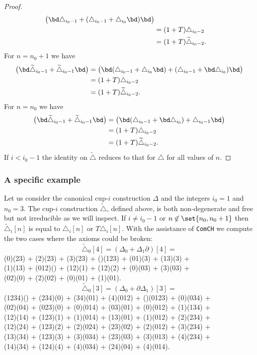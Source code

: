 \begin{proof}
\begin{align*}
		\big(\bd\triangle_{i_0-1} + (\triangle_{i_0-1} + \triangle_{i_0} \bd)\bd\big) \\ &=
		(1+T)\triangle_{i_0-2} \\ &=
		(1+T)\widetilde\triangle_{i_0-2}.
	\end{align*}
	For $n = n_0+1$ we have
	\begin{align*}
		\big(\bd\widetilde\triangle_{i_0-1} + \widetilde\triangle_{i_0-1} \bd\big) &=
		\big(\bd(\triangle_{i_0-1} + \triangle_{i_0} \bd) + (\triangle_{i_0-1} + \bd\triangle_{i_0})\bd \big) \\ &=
		(1+T)\triangle_{i_0-2} \\ &=
		(1+T)\widetilde\triangle_{i_0-2}.
	\end{align*}
	For $n = n_0$ we have
	\begin{align*}
		\big(\bd\widetilde\triangle_{i_0-1} + \widetilde\triangle_{i_0-1} \bd\big) &=
		\big(\bd(\triangle_{i_0-1} + \bd\triangle_{i_0}) + \triangle_{i_0-1}\bd \big) \\ &=
		(1+T)\triangle_{i_0-2} \\ &=
		(1+T)\widetilde\triangle_{i_0-2}.
	\end{align*}
	If $i<i_0-1$ the identity on $\widetilde\triangle$ reduces to that for $\triangle$ for all values of $n$.
\end{proof}

\subsubsection{A specific example}

Let us consider the canonical cup-$i$ construction $\Delta$ and the integers $i_0=1$ and $n_0=3$.
The cup-$i$ construction $\widetilde\triangle$, defined above, is both non-degenerate and free but not irreducible as we will inspect.
If $i \neq i_0-1$ or $n \not\in \set{n_0,n_0+1}$ then $\widetilde\triangle_i[n]$ is equal to $\triangle_i[n]$ or $T\triangle_i[n]$.
With the assistance of \texttt{ComCH} we compute the two cases where the axioms could be broken:
\[
\widetilde\triangle_0[4] = (\Delta_0 + \Delta_1\partial)[4] =
\]
\noindent
{\ttfamily
	(0)(23) + (2)(23) + (3)(23) + ()(123) + (01)(3) + (13)(3) +\\
	(1)(13) + (012)() + (12)(1) + (12)(2) + (0)(03) + (3)(03) +\\
	(02)(0) + (2)(02) + (0)(01) + (1)(01).}
\[
\widetilde\triangle_0[3] = (\Delta_0 + \partial\Delta_1)[3] =
\]
\noindent
{\ttfamily
	(1234)() + (234)(0) + (34)(01) + (4)(012) + ()(0123) + (0)(034) +\\
	(02)(04) + (023)(0) + (0)(014) + (03)(01) + (0)(012) + (1)(134) +\\
	(12)(14) + (123)(1) + (1)(014) + (13)(01) + (1)(012) + (2)(234) +\\
	(12)(24) + (123)(2) + (2)(024) + (23)(02) + (2)(012) + (3)(234) +\\
	(13)(34) + (123)(3) + (3)(034) + (23)(03) + (3)(013) + (4)(234) +\\
	(14)(34) + (124)(4) + (4)(034) + (24)(04) + (4)(014).}


